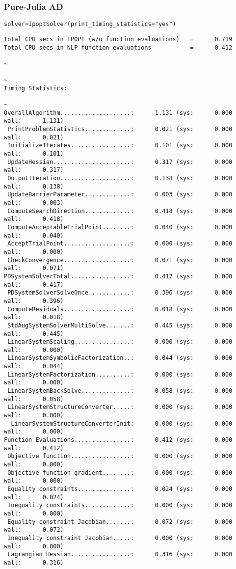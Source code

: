\documentclass[compressed,dvips,letter]{beamer}
\begin{document}
\begin{frame}[fragile]\frametitle{Pure-Julia AD}
{\footnotesize \texttt{solver=IpoptSolver(print\_timing\_statistics="yes")}}
{\fontsize{6pt}{0} \selectfont
\begin{verbatim}
Total CPU secs in IPOPT (w/o function evaluations)   =      0.719
Total CPU secs in NLP function evaluations           =      0.412
                                                                                                       ~
                                                                                                       ~
Timing Statistics:
                                                                                                       ~
OverallAlgorithm....................:      1.131 (sys:      0.000 wall:      1.131)
 PrintProblemStatistics.............:      0.021 (sys:      0.000 wall:      0.021)
 InitializeIterates.................:      0.101 (sys:      0.000 wall:      0.101)
 UpdateHessian......................:      0.317 (sys:      0.000 wall:      0.317)
 OutputIteration....................:      0.138 (sys:      0.000 wall:      0.138)
 UpdateBarrierParameter.............:      0.003 (sys:      0.000 wall:      0.003)
 ComputeSearchDirection.............:      0.418 (sys:      0.000 wall:      0.418)
 ComputeAcceptableTrialPoint........:      0.040 (sys:      0.000 wall:      0.040)
 AcceptTrialPoint...................:      0.000 (sys:      0.000 wall:      0.000)
 CheckConvergence...................:      0.071 (sys:      0.000 wall:      0.071)
PDSystemSolverTotal.................:      0.417 (sys:      0.000 wall:      0.417)
 PDSystemSolverSolveOnce............:      0.396 (sys:      0.000 wall:      0.396)
 ComputeResiduals...................:      0.018 (sys:      0.000 wall:      0.018)
 StdAugSystemSolverMultiSolve.......:      0.445 (sys:      0.000 wall:      0.445)
 LinearSystemScaling................:      0.000 (sys:      0.000 wall:      0.000)
 LinearSystemSymbolicFactorization..:      0.044 (sys:      0.000 wall:      0.044)
 LinearSystemFactorization..........:      0.000 (sys:      0.000 wall:      0.000)
 LinearSystemBackSolve..............:      0.058 (sys:      0.000 wall:      0.058)
 LinearSystemStructureConverter.....:      0.000 (sys:      0.000 wall:      0.000)
  LinearSystemStructureConverterInit:      0.000 (sys:      0.000 wall:      0.000)
Function Evaluations................:      0.412 (sys:      0.000 wall:      0.412)
 Objective function.................:      0.000 (sys:      0.000 wall:      0.000)
 Objective function gradient........:      0.000 (sys:      0.000 wall:      0.000)
 Equality constraints...............:      0.024 (sys:      0.000 wall:      0.024)
 Inequality constraints.............:      0.000 (sys:      0.000 wall:      0.000)
 Equality constraint Jacobian.......:      0.072 (sys:      0.000 wall:      0.072)
 Inequality constraint Jacobian.....:      0.000 (sys:      0.000 wall:      0.000)
 Lagrangian Hessian.................:      0.316 (sys:      0.000 wall:      0.316)
\end{verbatim}
}
\end{frame}
%
%
\end{document}

